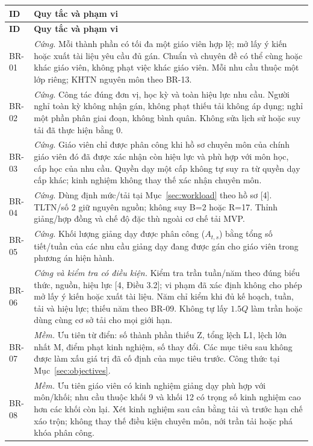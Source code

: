 \documentclass[12pt,a4paper]{report}
\begin{document}
\begin{longtable}{|p{1.45cm}|p{12.5cm}|}
\hline
\textbf{ID} & \textbf{Quy tắc và phạm vi} \\\hline
\endfirsthead
\hline
\textbf{ID} & \textbf{Quy tắc và phạm vi} \\\hline
\endhead
BR-01 & \textit{Cứng.} Mỗi thành phần có tối đa một giáo viên hợp lệ; mở lấy ý kiến hoặc xuất tài liệu yêu cầu đủ gán. Chuẩn và chuyên đề có thể cùng hoặc khác giáo viên, không phạt việc khác giáo viên. Mỗi nhu cầu thuộc một lớp riêng; KHTN nguyên môn theo BR-13. \\\hline
BR-02 & \textit{Cứng.} Công tác đúng đơn vị, học kỳ và toàn hiệu lực nhu cầu. Người nghỉ toàn kỳ không nhận gán, không phạt thiếu tải không áp dụng; nghỉ một phần phân giai đoạn, không bình quân. Không sửa lịch sử hoặc suy tải đã thực hiện bằng 0. \\\hline
BR-03 & \textit{Cứng.} Giáo viên chỉ được phân công khi hồ sơ chuyên môn của chính giáo viên đó đã được xác nhận còn hiệu lực và phù hợp với môn học, cấp học của nhu cầu. Quyền dạy một cấp không tự suy ra từ quyền dạy cấp khác; kinh nghiệm không thay thế xác nhận chuyên môn. \\\hline
BR-04 & \textit{Cứng.} Dùng định mức/tải tại Mục~\ref{sec:workload} theo hồ sơ [4]. TLTN/số 2 giữ nguyên nguồn; không suy B=2 hoặc R=17. Thỉnh giảng/hợp đồng và chế độ đặc thù ngoài cơ chế tải MVP. \\\hline
BR-05 & \textit{Cứng.} Khối lượng giảng dạy được phân công ($A_{t,s}$) bằng tổng số tiết/tuần của các nhu cầu giảng dạy đang được gán cho giáo viên trong phương án hiện hành. \\\hline
BR-06 & \textit{Cứng và kiểm tra có điều kiện.} Kiểm tra trần tuần/năm theo đúng biểu thức, nguồn, hiệu lực [4, Điều 3.2]; vi phạm đã xác định không cho phép mở lấy ý kiến hoặc xuất tài liệu. Năm chỉ kiểm khi đủ kế hoạch, tuần, tải và hiệu lực; thiếu năm theo BR-09. Không tự lấy $1.5Q$ làm trần hoặc dùng cùng cơ sở tải cho mọi giới hạn. \\\hline
BR-07 & \textit{Mềm.} Ưu tiên từ điển: số thành phần thiếu Z, tổng lệch L1, lệch lớn nhất M, điểm phạt kinh nghiệm, số thay đổi. Các mục tiêu sau không được làm xấu giá trị đã cố định của mục tiêu trước. Công thức tại Mục~\ref{sec:objectives}. \\\hline
BR-08 & \textit{Mềm.} Ưu tiên giáo viên có kinh nghiệm giảng dạy phù hợp với môn/khối; nhu cầu thuộc khối 9 và khối 12 có trọng số kinh nghiệm cao hơn các khối còn lại. Xét kinh nghiệm sau cân bằng tải và trước hạn chế xáo trộn; không thay thế điều kiện chuyên môn, nới trần tải hoặc phá khóa phân công. \\\hline

\end{longtable}
\end{document}
